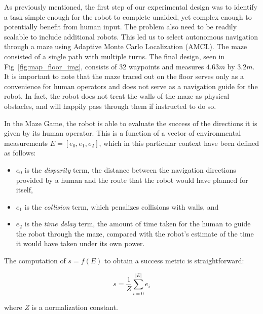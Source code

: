 \documentclass{sig-alternate}
\begin{document}
As previously mentioned, the first step of our experimental design was
to identify a task simple enough for the robot to complete unaided,
yet complex enough to potentially benefit from human input. The
problem also need to be readily scalable to include additional
robots. This led us to select autonomous navigation through a maze
using Adaptive Monte Carlo Localization (AMCL). The maze consisted of
a single path with multiple  turns.  The final
design, seen in Fig~\ref{fig:map_floor_img}, consists of 32 waypoints
and measures $4.63m$ by $3.2m$. It is important to note that the maze
traced out on the floor serves only as a convenience for human
operators and does not serve as a navigation guide for the robot. In
fact, the robot does not treat the walls of the maze as physical
obstacles, and will happily pass through them if instructed to do so.

In the Maze Game, the robot is able to evaluate the success of the
directions it is given by its human operator.  This is a function of a
vector of environmental measurements $E = [e_0, e_1, e_2]$, which in
this particular context have been defined as follows:

\begin{itemize}
\item $e_0$ is the \emph{disparity} term, the distance between the
  navigation directions provided by a human and the route that the
  robot would have planned for itself,
\item $e_1$ is the \emph{collision} term, which penalizes collisions
  with walls, and
\item $e_2$ is the \emph{time delay} term, the amount of time taken
  for the human to guide the robot through the maze, compared with the
  robot's estimate of the time it would have taken under its own power.
\end{itemize}

The computation of $s = f(E)$ to obtain a success metric is
straightforward:

\begin{equation}
s = \frac{1}{Z}\sum_{i=0}^{|E|} e_i
\end{equation}

where $Z$ is a normalization constant.

\end{document}
